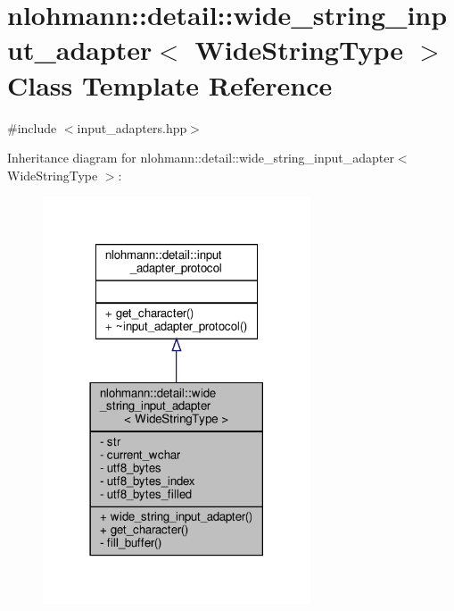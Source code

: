 \hypertarget{classnlohmann_1_1detail_1_1wide__string__input__adapter}{}\section{nlohmann\+:\+:detail\+:\+:wide\+\_\+string\+\_\+input\+\_\+adapter$<$ Wide\+String\+Type $>$ Class Template Reference}
\label{classnlohmann_1_1detail_1_1wide__string__input__adapter}


{\ttfamily \#include $<$input\+\_\+adapters.\+hpp$>$}



Inheritance diagram for nlohmann\+:\+:detail\+:\+:wide\+\_\+string\+\_\+input\+\_\+adapter$<$ Wide\+String\+Type $>$\+:\nopagebreak
\begin{figure}[H]
\begin{center}
\leavevmode
\includegraphics[width=225pt]{classnlohmann_1_1detail_1_1wide__string__input__adapter__inherit__graph}
\end{center}
\end{figure}



